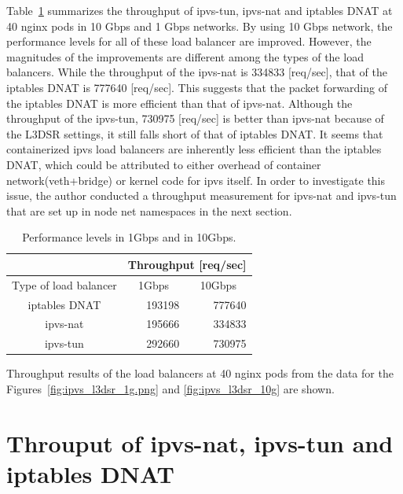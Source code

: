Table~\ref{table:nat_tun_dnat_1g_10g} summarizes the throughput of ipvs-tun, ipvs-nat and iptables DNAT at 40 nginx pods in 10 Gbps and 1 Gbps networks.
By using 10 Gbps network, the performance levels for all of these load balancer are improved.
However, the magnitudes of the improvements are different among the types of the load balancers.
While the throughput of the ipvs-nat is 334833 [req/sec], that of the iptables DNAT is 777640 [req/sec].
This suggests that the packet forwarding of the iptables DNAT is more efficient than that of ipvs-nat.
Although the throughput of the ipvs-tun, 730975 [req/sec] is better than ipvs-nat because of the L3DSR settings, it still falls short of that of iptables DNAT.
It seems that containerized ipvs load balancers are inherently less efficient than the iptables DNAT, which could be attributed to either overhead of container network(veth+bridge) or kernel code for ipvs itself.
In order to investigate this issue, the author conducted a throughput measurement for ipvs-nat and ipvs-tun that are set up in node net namespaces in the next section.

\begin{table}[H]
  \centering
  \begin{tabular}{|l|r|r|}
    \hline
    & \multicolumn{2}{c|}{Throughput {[}req/sec{]}} \\ \hline
    Type of load balancer & \multicolumn{1}{c|}{1Gbps} & \multicolumn{1}{c|}{\cellcolor[HTML]{ECF4FF}10Gbps} \\ \hline
    \multicolumn{1}{c|}{iptables DNAT} & 193198 & \cellcolor[HTML]{ECF4FF}777640 \\ \hline
    \multicolumn{1}{c|}{ipvs-nat} & 195666 & \cellcolor[HTML]{ECF4FF}334833 \\ \hline
    \multicolumn{1}{c|}{ipvs-tun} & 292660 & \cellcolor[HTML]{ECF4FF}730975 \\ \hline
  \end{tabular}
  \caption{Performance levels in 1Gbps and in 10Gbps.}
  \raggedright
  Throughput results of the load balancers at 40 nginx pods from the data for the Figures~\ref{fig:ipvs_l3dsr_1g.png} and \ref{fig:ipvs_l3dsr_10g} are shown.
  \label{table:nat_tun_dnat_1g_10g}
\end{table}

\FloatBarrier
\section{Throuput of ipvs-nat, ipvs-tun and iptables DNAT}

